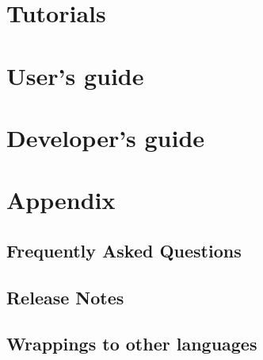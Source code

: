 \documentclass{InsightSoftwareGuide}
\begin{document}




\part{Tutorials}\label{part:tutorials}




\part{User's guide}\label{part:userguide}

























\part{Developer's guide}\label{part:developerguide}






\part{Appendix}\label{part:appendix}
\chapter{Frequently Asked Questions}
\label{sec:FrequentlyAskedQuestions}


\chapter{Release Notes}
\label{sec:ReleaseNotes}


\chapter{Wrappings to other languages}
\label{chap:wrappings}
\end{document}
